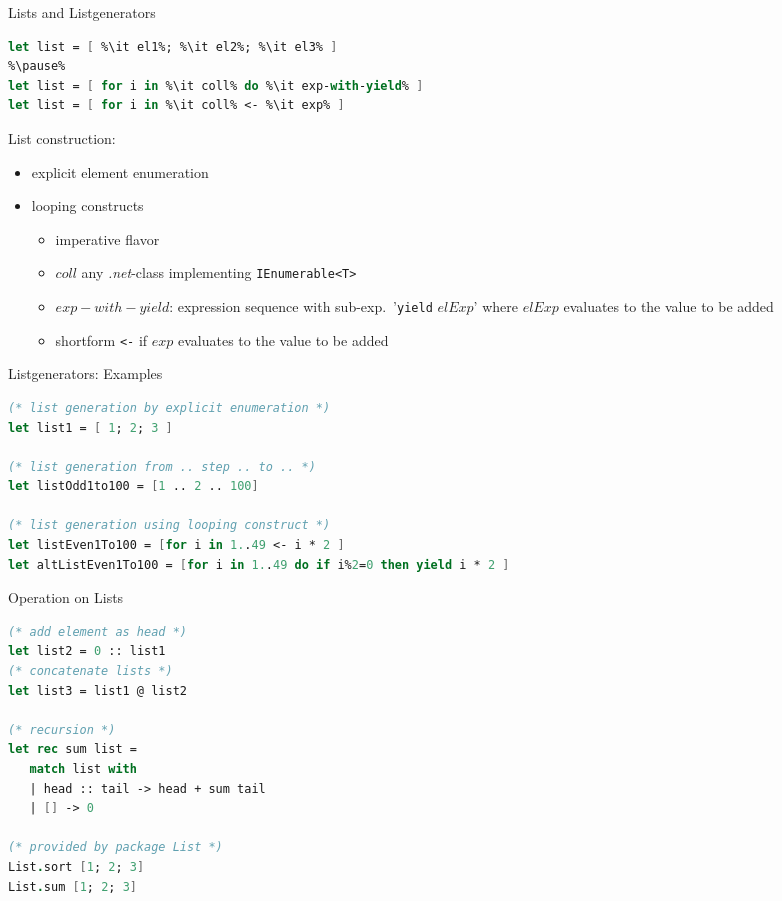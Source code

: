\documentclass{beamer}
\begin{document}
\begin{frame}[fragile]{Lists and Listgenerators}
\begin{overlayarea}{\textwidth}{0.3\textheight}
\begin{lstlisting}[language=FSharp, escapechar=\%]
let list = [ %\it el1%; %\it el2%; %\it el3% ]   
%\pause%
let list = [ for i in %\it coll% do %\it exp-with-yield% ]   
let list = [ for i in %\it coll% <- %\it exp% ]   
\end{lstlisting}
\end{overlayarea}
List construction:
\begin{itemize}
\item explicit element enumeration
\item looping constructs
  \begin{itemize}
    \item imperative flavor
    \item $coll$ any \textsl{.net}-class implementing \texttt{IEnumerable<T>} 
    \item $exp-with-yield$: expression sequence with sub-exp.\ '\lstinline!yield! $elExp$' where $elExp$ evaluates to the value to be added
    \item shortform \lstinline!<-! if $exp$ evaluates to the value to be added 
 \end{itemize}
\end{itemize}
\end{frame}

\begin{frame}[fragile]{Listgenerators: Examples}
\begin{lstlisting}[language=FSharp]
 (* list generation by explicit enumeration *)
let list1 = [ 1; 2; 3 ] 

(* list generation from .. step .. to .. *)
let listOdd1to100 = [1 .. 2 .. 100]

(* list generation using looping construct *)
let listEven1To100 = [for i in 1..49 <- i * 2 ]  
let altListEven1To100 = [for i in 1..49 do if i%2=0 then yield i * 2 ]  

\end{lstlisting}
\end{frame}

\begin{frame}[fragile]{Operation on Lists}
\begin{lstlisting}[language=FSharp]
(* add element as head *)
let list2 = 0 :: list1
(* concatenate lists *)
let list3 = list1 @ list2

(* recursion *)
let rec sum list =
   match list with
   | head :: tail -> head + sum tail
   | [] -> 0

(* provided by package List *)
List.sort [1; 2; 3]
List.sum [1; 2; 3]
\end{lstlisting}

\end{frame}
\end{document}
